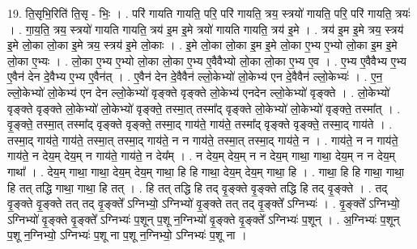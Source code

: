 \documentclass[17pt]{extarticle}
\begin{document}
19. ति॒सृभि॒रिति॑ ति॒सृ - भिः॒ । . परि॑ गायति गायति॒ परि॒ परि॑ गायति॒ त्रय॒ स्त्रयो॑ गायति॒ परि॒ परि॑ गायति॒ त्रयः॑ । . गा॒य॒ति॒ त्रय॒ स्त्रयो॑ गायति गायति॒ त्रय॑ इ॒म इ॒मे त्रयो॑ गायति गायति॒ त्रय॑ इ॒मे । . त्रय॑ इ॒म इ॒मे त्रय॒ स्त्रय॑ इ॒मे लो॒का लो॒का इ॒मे त्रय॒ स्त्रय॑ इ॒मे लो॒काः । . इ॒मे लो॒का लो॒का इ॒म इ॒मे लो॒का ए॒भ्य ए॒भ्यो लो॒का इ॒म इ॒मे लो॒का ए॒भ्यः । . लो॒का ए॒भ्य ए॒भ्यो लो॒का लो॒का ए॒भ्य ए॒वैवैभ्यो लो॒का लो॒का ए॒भ्य ए॒व । . ए॒भ्य ए॒वैवैभ्य ए॒भ्य ए॒वैन॑ देन दे॒वैभ्य ए॒भ्य ए॒वैन॑त् । . ए॒वैन॑ देन दे॒वैवैन॑ ल्लो॒केभ्यो॑ लो॒केभ्य॑ एन दे॒वैवैन॑ ल्लो॒केभ्यः॑ । . ए॒न॒ ल्लो॒केभ्यो॑ लो॒केभ्य॑ एन देन ल्लो॒केभ्यो॑ वृङ्क्ते वृङ्क्ते लो॒केभ्य॑ एनदेन ल्लो॒केभ्यो॑ वृङ्क्ते । . लो॒केभ्यो॑ वृङ्क्ते वृङ्क्ते लो॒केभ्यो॑ लो॒केभ्यो॑ वृङ्क्ते॒ तस्मा॒त् तस्मा᳚द् वृङ्क्ते लो॒केभ्यो॑ लो॒केभ्यो॑ वृङ्क्ते॒ तस्मा᳚त् । . वृ॒ङ्क्ते॒ तस्मा॒त् तस्मा᳚द् वृङ्क्ते वृङ्क्ते॒ तस्मा॒द् गाय॑ते॒ गाय॑ते॒ तस्मा᳚द् वृङ्क्ते वृङ्क्ते॒ तस्मा॒द् गाय॑ते । . तस्मा॒द् गाय॑ते॒ गाय॑ते॒ तस्मा॒त् तस्मा॒द् गाय॑ते॒ न न गाय॑ते॒ तस्मा॒त् तस्मा॒द् गाय॑ते॒ न । . गाय॑ते॒ न न गाय॑ते॒ गाय॑ते॒ न देय॒म् देय॒म् न गाय॑ते॒ गाय॑ते॒ न देय᳚म् । . न देय॒म् देय॒म् न न देय॒म् गाथा॒ गाथा॒ देय॒म् न न देय॒म् गाथा᳚ । . देय॒म् गाथा॒ गाथा॒ देय॒म् देय॒म् गाथा॒ हि हि गाथा॒ देय॒म् देय॒म् गाथा॒ हि । . गाथा॒ हि हि गाथा॒ गाथा॒ हि तत् तद्धि गाथा॒ गाथा॒ हि तत् । . हि तत् तद्धि हि तद् वृ॒ङ्क्ते वृ॒ङ्क्ते तद्धि हि तद् वृ॒ङ्क्ते । . तद् वृ॒ङ्क्ते वृ॒ङ्क्ते तत् तद् वृ॒ङ्क्ते᳚ ऽग्निभ्यो॒ ऽग्निभ्यो॑ वृ॒ङ्क्ते तत् तद् वृ॒ङ्क्ते᳚ ऽग्निभ्यः॑ । . वृ॒ङ्क्ते᳚ ऽग्निभ्यो॒ ऽग्निभ्यो॑ वृ॒ङ्क्ते वृ॒ङ्क्ते᳚ ऽग्निभ्यः॑ प॒शून् प॒शू न॒ग्निभ्यो॑ वृ॒ङ्क्ते वृ॒ङ्क्ते᳚ ऽग्निभ्यः॑ प॒शून् । . अ॒ग्निभ्यः॑ प॒शून् प॒शू न॒ग्निभ्यो॒ ऽग्निभ्यः॑ प॒शू ना प॒शू न॒ग्निभ्यो॒ ऽग्निभ्यः॑ प॒शू ना । \newline
\end{document}
